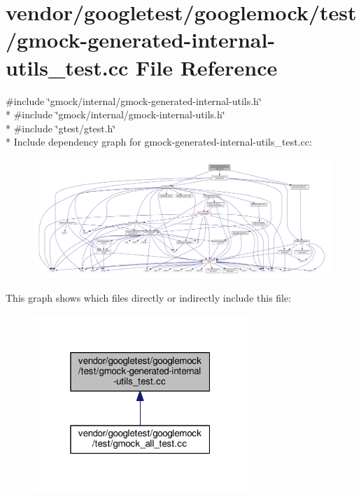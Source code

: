 \hypertarget{gmock-generated-internal-utils__test_8cc}{}\section{vendor/googletest/googlemock/test/gmock-\/generated-\/internal-\/utils\+\_\+test.cc File Reference}
\label{gmock-generated-internal-utils__test_8cc}
{\ttfamily \#include \char`\"{}gmock/internal/gmock-\/generated-\/internal-\/utils.\+h\char`\"{}}\\*
{\ttfamily \#include \char`\"{}gmock/internal/gmock-\/internal-\/utils.\+h\char`\"{}}\\*
{\ttfamily \#include \char`\"{}gtest/gtest.\+h\char`\"{}}\\*
Include dependency graph for gmock-\/generated-\/internal-\/utils\+\_\+test.cc\+:
\nopagebreak
\begin{figure}[H]
\begin{center}
\leavevmode
\includegraphics[width=350pt]{gmock-generated-internal-utils__test_8cc__incl}
\end{center}
\end{figure}
This graph shows which files directly or indirectly include this file\+:
\nopagebreak
\begin{figure}[H]
\begin{center}
\leavevmode
\includegraphics[width=229pt]{gmock-generated-internal-utils__test_8cc__dep__incl}
\end{center}
\end{figure}
